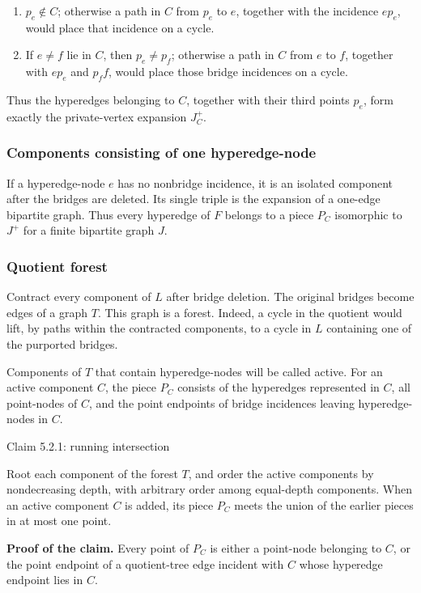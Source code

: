 \documentclass[11pt]{article}
\newcommand{\tightlist}{\setlength{\itemsep}{0pt}\setlength{\parskip}{0pt}}
\begin{document}
\begin{enumerate}
\def\labelenumi{\arabic{enumi}.}
\tightlist
\item
  \(p_e\notin C\); otherwise a path in \(C\) from \(p_e\) to \(e\), together with the incidence \(ep_e\), would place that incidence on a cycle.
\item
  If \(e\ne f\) lie in \(C\), then \(p_e\ne p_f\); otherwise a path in \(C\) from \(e\) to \(f\), together with \(ep_e\) and \(p_ff\), would place those bridge incidences on a cycle.
\end{enumerate}

Thus the hyperedges belonging to \(C\), together with their third points \(p_e\), form exactly the private-vertex expansion \(J_C^+\).

\subsubsection{Components consisting of one hyperedge-node}\label{components-consisting-of-one-hyperedge-node}

If a hyperedge-node \(e\) has no nonbridge incidence, it is an isolated component after the bridges are deleted. Its single triple is the expansion of a one-edge bipartite graph. Thus every hyperedge of \(F\) belongs to a piece \(P_C\) isomorphic to \(J^+\) for a finite bipartite graph \(J\).

\subsubsection{Quotient forest}\label{quotient-forest}

Contract every component of \(L\) after bridge deletion. The original bridges become edges of a graph \(T\). This graph is a forest. Indeed, a cycle in the quotient would lift, by paths within the contracted components, to a cycle in \(L\) containing one of the purported bridges.

Components of \(T\) that contain hyperedge-nodes will be called active. For an active component \(C\), the piece \(P_C\) consists of the hyperedges represented in \(C\), all point-nodes of \(C\), and the point endpoints of bridge incidences leaving hyperedge-nodes in \(C\).

\label{claim-5.2.1-running-intersection}
\begin{claimbox}{Claim 5.2.1: running intersection}

Root each component of the forest \(T\), and order the active components by nondecreasing depth, with arbitrary order among equal-depth components. When an active component \(C\) is added, its piece \(P_C\) meets the union of the earlier pieces in at most one point.

\end{claimbox}
\textbf{Proof of the claim.} Every point of \(P_C\) is either a point-node belonging to \(C\), or the point endpoint of a quotient-tree edge incident with \(C\) whose hyperedge endpoint lies in \(C\).
\end{document}
